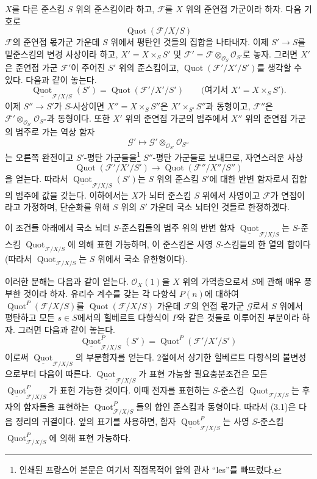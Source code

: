 
$X$를 다른 준스킴 $S$ 위의 준스킴이라 하고, $\mathcal F$를 $X$ 위의
준연접 가군이라 하자. 다음 기호로
\[
\operatorname{Quot}(\mathcal F/X/S)
\]
$\mathcal F$의 준연접 몫가군 가운데 $S$ 위에서 평탄인 것들의 집합을
나타내자. 이제 $S'\longrightarrow S$를 밑준스킴의 변경 사상이라 하고,
$X'=X\times_S S'$ 및
$\mathcal F'=\mathcal F\otimes_{\mathcal O_S}\mathcal O_{S'}$로 놓자.
그러면 $X'$은 준연접 가군
$\mathcal F'$이 주어진 $S'$ 위의 준스킴이고,
$\operatorname{Quot}(\mathcal F'/X'/S')$를 생각할 수 있다. 다음과 같이
놓는다.
\[
\underline{\operatorname{Quot}}_{\mathcal F/X/S}(S')
=\operatorname{Quot}(\mathcal F'/X'/S')
\qquad\text{(여기서 $X'=X\times_SS'$)}.
\]
이제 $S''\longrightarrow S'$가 $S$-사상이면
$X''=X\times_SS''$은 $X'\times_{S'}S''$과 동형이고, $\mathcal F''$은
$\mathcal F'\otimes_{\mathcal O_{S'}}\mathcal O_{S''}$과 동형이다. 또한
$X'$ 위의 준연접 가군의 범주에서 $X''$ 위의 준연접 가군의 범주로 가는
역상 함자
\[
\mathcal G'\longmapsto
\mathcal G'\otimes_{\mathcal O_{S'}}\mathcal O_{S''}
\]
는 오른쪽 완전이고 $S'$-평탄 가군들을\footnote{인쇄된 프랑스어 본문은 여기서 직접목적어 앞의 관사 ``les''를
빠뜨렸다.} $S''$-평탄 가군들로 보내므로, 자연스러운 사상
\[
\operatorname{Quot}(\mathcal F'/X'/S')\longrightarrow
\operatorname{Quot}(\mathcal F''/X''/S'')
\]
을 얻는다. 따라서 $\underline{\operatorname{Quot}}_{\mathcal F/X/S}(S')$는
$S$ 위의 준스킴 $S'$에 대한 반변 함자로서 집합의 범주에 값을 갖는다.
이하에서는 $X$가 뇌터 준스킴 $S$ 위에서 사영이고 $\mathcal F$가
연접이라고 가정하며, 단순화를 위해 $S$ 위의 $S'$ 가운데 국소 뇌터인
것들로 한정하겠다.

 이 조건들 아래에서 국소 뇌터 $S$-준스킴들의 범주
위의 반변 함자 $\underline{\operatorname{Quot}}_{\mathcal F/X/S}$는
$S$-준스킴 $\operatorname{Quot}_{\mathcal F/X/S}$에 의해 표현 가능하며,
이 준스킴은 사영 $S$-스킴들의 한 열의 합이다(따라서
$\operatorname{Quot}_{\mathcal F/X/S}$는 $S$ 위에서 국소 유한형이다).

이러한 분해는 다음과 같이 얻는다. $\mathcal O_X(1)$을 $X$ 위의
가역층으로서 $S$에 관해 매우 풍부한 것이라 하자. 유리수 계수를 갖는
각 다항식 $P(n)$에 대하여 $\operatorname{Quot}^P(\mathcal F/X/S)$를
$\operatorname{Quot}(\mathcal F/X/S)$ 가운데 $\mathcal F$의 연접
몫가군 $\mathcal G$로서 $S$ 위에서 평탄하고 모든 $s\in S$에서의
힐베르트 다항식이 $P$와 같은 것들로 이루어진 부분이라 하자. 그러면
다음과 같이 놓는다.
\[
\underline{\operatorname{Quot}}^P_{\mathcal F/X/S}(S')
=\operatorname{Quot}^P(\mathcal F'/X'/S')
\]
이로써 $\underline{\operatorname{Quot}}_{\mathcal F/X/S}$의 부분함자를
얻는다. 2절에서 상기한 힐베르트 다항식의 불변성으로부터 다음이
따른다. $\underline{\operatorname{Quot}}_{\mathcal F/X/S}$가 표현
가능할 필요충분조건은 모든
$\underline{\operatorname{Quot}}^P_{\mathcal F/X/S}$가 표현 가능한
것이다. 이때 전자를 표현하는 $S$-준스킴
$\operatorname{Quot}_{\mathcal F/X/S}$는 후자의 함자들을 표현하는
$\operatorname{Quot}^P_{\mathcal F/X/S}$들의 합인 준스킴과 동형이다.
따라서 (3.1)은 다음 정리의 귀결이다.
 앞의 표기를 사용하면, 함자
$\underline{\operatorname{Quot}}^P_{\mathcal F/X/S}$는 사영
$S$-준스킴 $\operatorname{Quot}^P_{\mathcal F/X/S}$에 의해 표현
가능하다.

